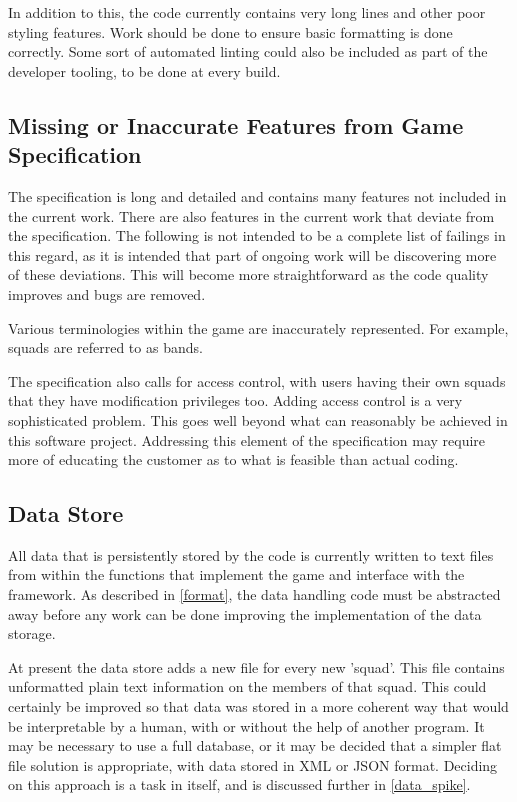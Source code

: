 \documentclass[a4paper,12pt]{article}
\begin{document}
In addition to this, the code currently contains very long lines and other poor styling features. Work should be done to ensure basic formatting is done correctly. Some sort of automated linting could also be included as part of the developer tooling, to be done at every build.

\subsection{Missing or Inaccurate Features from Game Specification}
The specification is long and detailed and contains many features not included in the current work. There are also features in the current work that deviate from the specification. The following is not intended to be a complete list of failings in this regard, as it is intended that part of ongoing work will be discovering more of these deviations. This will become more straightforward as the code quality improves and bugs are removed.

Various terminologies within the game are inaccurately represented. For example, squads are referred to as bands.

The specification also calls for access control, with users having their own squads that they have modification privileges too. Adding access control is a very sophisticated problem. This goes well beyond what can reasonably be achieved in this software project. Addressing this element of the specification may require more of educating the customer as to what is feasible than actual coding.

\subsection{Data Store}
All data that is persistently stored by the code is currently written to text files from within the functions that implement the game and interface with the framework. As described in \ref{format}, the data handling code must be abstracted away before any work can be done improving the implementation of the data storage.

At present the data store adds a new file for every new 'squad'. This file contains unformatted plain text information on the members of that squad. This could certainly be improved so that data was stored in a more coherent way that would be interpretable by a human, with or without the help of another program. It may be necessary to use a full database, or it may be decided that a simpler flat file solution is appropriate, with data stored in XML or JSON format. Deciding on this approach is a task in itself, and is discussed further in \ref{data_spike}.
\end{document}
